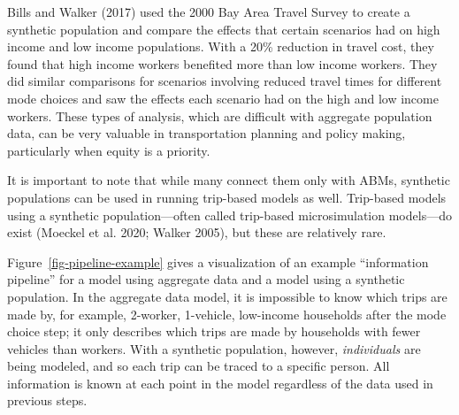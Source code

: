 \documentclass[fancy, oneside, mastersfancy, ms]{byuthesis}
\begin{document}
Bills and Walker (2017) used the 2000 Bay Area Travel Survey to create a
synthetic population and compare the effects that certain scenarios had
on high income and low income populations. With a 20\% reduction in
travel cost, they found that high income workers benefited more than low
income workers. They did similar comparisons for scenarios involving
reduced travel times for different mode choices and saw the effects each
scenario had on the high and low income workers. These types of
analysis, which are difficult with aggregate population data, can be
very valuable in transportation planning and policy making, particularly
when equity is a priority.

It is important to note that while many connect them only with ABMs,
synthetic populations can be used in running trip-based models as well.
Trip-based models using a synthetic population---often called trip-based
microsimulation models---do exist (Moeckel et al. 2020; Walker 2005),
but these are relatively rare.

Figure~\ref{fig-pipeline-example} gives a visualization of an example
``information pipeline'' for a model using aggregate data and a model
using a synthetic population. In the aggregate data model, it is
impossible to know which trips are made by, for example, 2-worker,
1-vehicle, low-income households after the mode choice step; it only
describes which trips are made by households with fewer vehicles than
workers. With a synthetic population, however, \emph{individuals} are
being modeled, and so each trip can be traced to a specific person. All
information is known at each point in the model regardless of the data
used in previous steps.
\end{document}
